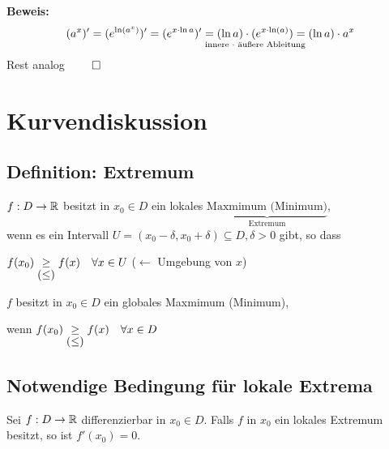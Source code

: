 \documentclass[10pt, a4paper, fleqn]{article}
\begin{document}
\textbf{Beweis: }
\[
    (a^x)' = (e^{\ln(a^x)})' = (e^{x \cdot \ln a})' =
    \underset{\mathclap{\text{innere $\cdot$ äußere Ableitung}}}{(\ln a) \cdot (e^{x \cdot \ln(a)})} =
    (\ln a) \cdot a^x 
\]
Rest analog $\qed$

\section*{Kurvendiskussion}
\subsection{Definition: Extremum}

$f: D \to \mathbb{R}$ besitzt in $x_0 \in D$ ein lokales $\underbrace{\text{Maxmimum (Minimum)}}_{\text{Extremum}}$, \\
wenn es ein Intervall $U = (x_0 - \delta, x_0 + \delta) \subseteq D, \delta > 0$ gibt, so dass

$f(x_0) \underset{\hbox{$(\leq)$}}{\geq} f(x) \quad \forall x \in U$ ($\leftarrow$ Umgebung von $x$)

$f$ besitzt in $x_0 \in D$ ein globales Maxmimum (Minimum),

wenn $f(x_0) \underset{\hbox{$(\leq)$}}{\geq} f(x) \quad \forall x \in D$

\subsection{Notwendige Bedingung für lokale Extrema}
Sei $f: D \to \mathbb{R}$ differenzierbar in $x_0 \in D$.
Falls $f$ in $x_0$ ein lokales Extremum besitzt, so ist $f'(x_0) = 0$.
\bigskip
\end{document}
